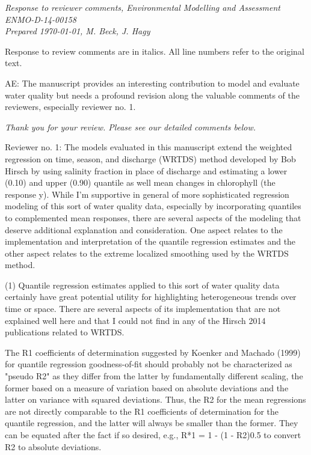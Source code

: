 \documentclass[letterpaper,12pt,oneside]{article}\usepackage[]{graphicx}\usepackage[]{color}
\begin{document}
\raggedbottom
\raggedright
{}
\setlength{\parindent}{0in}
\setlength{\parskip}{\baselineskip}

{\it Response to reviewer comments, Environmental Modelling and Assessment ENMO-D-14-00158\\
Prepared \today, M. Beck, J. Hagy

Response to review comments are in italics.  All line numbers refer to the original text.
}

AE:
The manuscript provides an interesting contribution to model and evaluate water quality but needs a profound revision along the valuable comments of the 
reviewers, especially reviewer no. 1.

{\it Thank you for your review.  Please see our detailed comments below.}

Reviewer no. 1: The models evaluated in this manuscript extend the weighted regression on time, season, and discharge (WRTDS) method developed by Bob Hirsch by using salinity fraction in place of discharge and estimating a lower (0.10) and upper (0.90) quantile as well mean changes in chlorophyll (the response y).  While I'm supportive in general of more sophisticated regression modeling of this sort of water quality data, especially by incorporating quantiles to complemented mean responses, there are several aspects of the modeling that deserve additional explanation and consideration.  One aspect relates to the implementation and interpretation of the quantile regression estimates and the other aspect relates to the extreme localized smoothing used by the WRTDS method.

(1)  Quantile regression estimates applied to this sort of water quality data certainly have great potential utility for highlighting heterogeneous trends over time or space.  There are several aspects of its implementation that are not explained well here and that I could not find in any of the Hirsch 2014 publications related to WRTDS. 

The R1 coefficients of determination suggested by Koenker and Machado (1999) for quantile regression goodness-of-fit should probably not be characterized as "pseudo R2" as they differ from the latter by fundamentally different scaling, the former based on a measure of variation based on absolute deviations and the latter on variance with squared deviations.  Thus, the R2 for the mean regressions are not directly comparable to the R1 coefficients of determination for the quantile regression, and the latter will always be smaller than the former.   They can be equated after the fact if so desired, e.g., R*1 = 1 - (1 - R2)0.5 to convert R2 to absolute deviations.  
\end{document}
